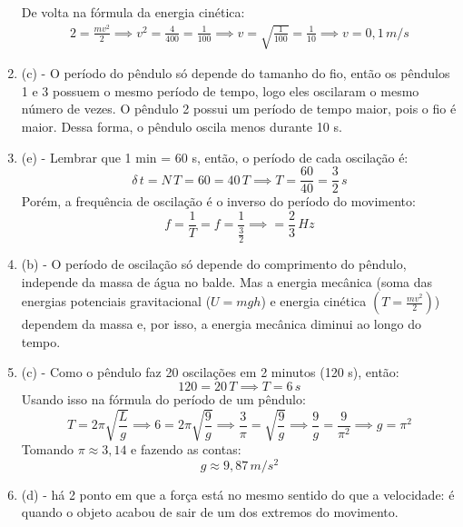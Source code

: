 \documentclass[12pt,letterpaper,fleqn]{article}
\begin{document}
\begin{enumerate}
    De volta na fórmula da energia cinética:
    \begin{align*}
        2 = \frac{mv^2}{2} \implies v^2 = \frac{4}{400} = \frac{1}{100} \implies v= \sqrt{\frac{1}{100}} = \frac{1}{10} \implies \boxed{v = 0,1\,m/s}
    \end{align*}
    \item (c) - O período do pêndulo só depende do tamanho do fio, então os pêndulos 1 e 3 possuem o mesmo período de tempo, logo eles oscilaram o mesmo número de vezes. O pêndulo 2 possui um período de tempo maior, pois o fio é maior. Dessa forma, o pêndulo oscila menos durante 10 s.
    \item (e) - Lembrar que 1 min = 60 s, então, o período de cada oscilação é:
    \begin{equation*}
        \delta\,t = N\,T = 60 = 40\,T \implies T=\frac{60}{40} =\frac{3}{2}\,s
    \end{equation*}
    Porém, a frequência de oscilação é o inverso do período do movimento:
    \begin{equation*}
        f = \frac{1}{T} = f = \frac{1}{\frac{3}{2}} \implies = \frac{2}{3}\,Hz
    \end{equation*}
    \item (b) - O período de oscilação só depende do comprimento do pêndulo, independe da massa de água no balde. Mas a energia mecânica (soma das energias potenciais gravitacional ($U = mgh$) e energia cinética $\left(T=\frac{mv^2}{2}\right)$) dependem da massa e, por isso, a energia mecânica diminui ao longo do tempo.
    \item (c) - Como o pêndulo faz 20 oscilações em 2 minutos (120 s), então:
    \begin{equation*}
        120 = 20\,T \implies T = 6\,s    
    \end{equation*}
    Usando isso na fórmula do período de um pêndulo:
    \begin{equation*}
        T = 2\pi\sqrt{\frac{L}{g}} \implies 6 = 2\pi\sqrt{\frac{9}{g}} \implies \frac{3}{\pi} = \sqrt{\frac{9}{g}} \implies \frac{9}{g} = \frac{9}{\pi^2} \implies g = \pi^2
    \end{equation*}
    Tomando $\pi\approx 3,14$ e fazendo as contas:
    \begin{equation*}
        g \approx 9,87\,m/s^2
    \end{equation*}
    \item (d) - há 2 ponto em que a força está no mesmo sentido do que a velocidade: é quando o objeto acabou de sair de um dos extremos do movimento.
\end{enumerate}
\end{document}
